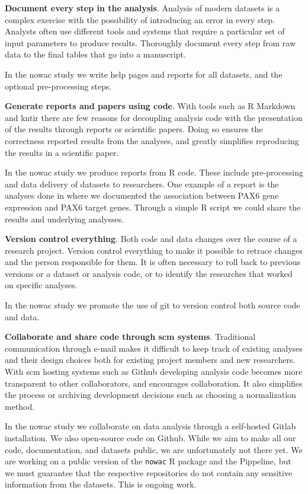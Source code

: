 \textbf{Document every step in the analysis}. Analysis of modern datasets is a
complex exercise with the possibility of introducing an error in every step.
Analysts often use different tools and systems that require a particular set of
input parameters to produce results. Thoroughly document every step from raw
data to the final tables that go into a manuscript.

In the \gls{nowac} study we write help pages and reports for all datasets, and
the optional pre-processing steps. 

\textbf{Generate reports and papers using code}. With tools such as R
Markdown\cite{rmarkdown} and kntir there are few reasons for decoupling analysis
code with the presentation of the results through reports or scientific papers.
Doing so ensures the correctness reported results from the analyses, and greatly
simplifies reproducing the results in a scientific paper. 

In the \gls{nowac} study we produce reports from R code. These include
pre-processing and data delivery of datasets to researchers. One example of a
report is the analyses done in \cite{kiselev2018transcription} where we
documented the association between PAX6 gene expression and PAX6 target genes.
Through a simple R script we could share the results and underlying analysses.

\textbf{Version control everything}. Both code and data changes over the course
of a research project. Version control everything to make it possible to retrace
changes and the person responsible for them. It is often necessary to roll back
to previous versions or a dataset or analysis code, or to identify the
researches that worked on specific analyses. 

In the \gls{nowac} study we promote the use of git to version control both
source code and data. 

\textbf{Collaborate and share code through \gls{scm} systems}. Traditional
communication through e-mail makes it difficult to keep track of existing
analyses and their design choices both for existing project members and new
researchers. With \gls{scm} hosting systems such as Github developing
analysis code becomes more transparent to other collaborators, and encourages
collaboration. It also simplifies the process or archiving development decisions
such as choosing a normalization method.

In the \gls{nowac} study we collaborate on data analysis through a self-hosted
Gitlab\cite{gitlab} installation. We also open-source code on Github. 
While we aim to make all our code, documentation, and datasets public, we are
unfortunately not there yet. We are working on a public version of the
\texttt{nowac} R package and the Pippeline, but we must guarantee that the
respective repositories do not contain any sensitive information from the
datasets. This is ongoing work. 

